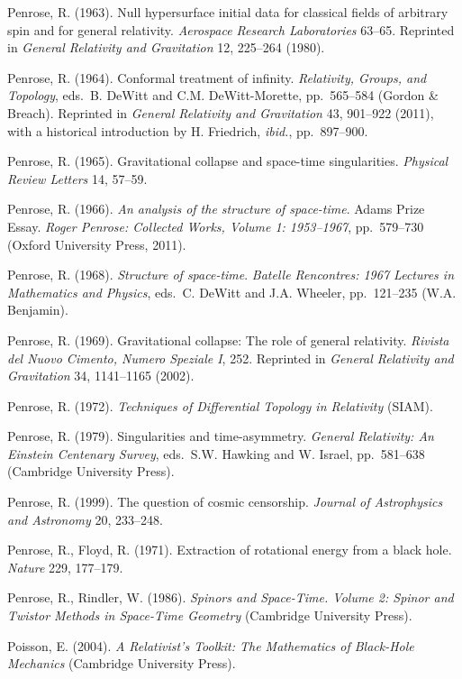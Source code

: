 \documentclass[12pt]{article}
\begin{document}
\begin{small}
\begin{thebibliography}{99}
 \item[]  Penrose, R. (1963).  Null hypersurface initial data for classical fields of arbitrary spin and for general relativity.
 \emph{Aerospace Research Laboratories} 63--65. Reprinted in \emph{General Relativity and Gravitation} 12, 225--264 (1980).
 \item[]  Penrose, R. (1964). Conformal treatment of infinity. \emph{Relativity, Groups, and Topology}, eds.\  B. DeWitt and C.M. DeWitt-Morette,  pp.\ 565--584 (Gordon \& Breach). Reprinted in \emph{General Relativity and Gravitation} 43, 901--922 (2011), with a historical introduction by H. Friedrich, \emph{ibid.}, pp.\ 897--900. 
  \item[]  Penrose, R. (1965). Gravitational collapse and space-time singularities. \emph{Physical Review Letters} 14, 57--59.
\item[] Penrose, R. (1966). \emph{An analysis of the structure of space-time}. Adams Prize Essay. \emph{Roger Penrose: Collected Works, Volume 1: 1953--1967}, pp.\ 579--730 (Oxford University Press, 2011). 
\item[] Penrose, R. (1968). \emph{Structure of space-time}.
\emph{Batelle Rencontres: 1967 Lectures in Mathematics and Physics}, eds.\  
 C. DeWitt and J.A. Wheeler, pp.\ 121--235 (W.A. Benjamin). 
    \item[]  Penrose, R. (1969).
      Gravitational collapse: The role of general relativity. \emph{ 
Rivista del Nuovo Cimento, Numero Speziale I}, 252.
      Reprinted in \emph{General Relativity and Gravitation}  34, 1141--1165 (2002).
    \item[]  Penrose, R. (1972). \emph{Techniques of Differential Topology in Relativity} (SIAM). 
        \item[]  Penrose, R. (1979). Singularities and time-asymmetry. \emph{General Relativity: An Einstein Centenary Survey},
        eds.\ S.W. Hawking and W. Israel, pp.\  581--638  (Cambridge University Press). 
      \item[]  Penrose, R. (1999).  The question of cosmic censorship. \emph{Journal of Astrophysics and Astronomy} 20, 233--248.   
      \item[]   Penrose, R.,  Floyd, R. (1971). Extraction of rotational energy from a black hole. \emph{Nature} 229, 
 177--179.
         \item[]  Penrose, R., Rindler, W. (1986). \emph{Spinors and Space-Time. Volume 2: Spinor and Twistor Methods in Space-Time Geometry} (Cambridge University Press).     
  \item[] Poisson, E. (2004). \emph{A Relativist's Toolkit: The Mathematics of Black-Hole Mechanics} (Cambridge University Press).     

\end{thebibliography}
\end{small}
\end{document}
